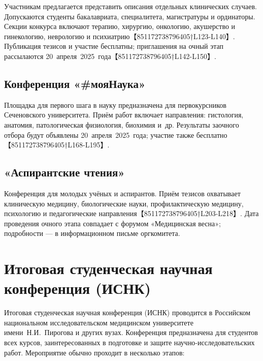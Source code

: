 \documentclass[
  russian,
  12pt,
  a4paper,
]{article}
\begin{document}
Участникам предлагается представить описания отдельных клинических
случаев. Допускаются студенты бакалавриата, специалитета, магистратуры и
ординаторы. Секции конкурса включают терапию, хирургию, онкологию,
акушерство и гинекологию, неврологию и
психиатрию【851172738796405†L123-L140】. Публикация тезисов и участие
бесплатны; приглашения на очный этап рассылаются
20~апреля~2025~года【851172738796405†L142-L150】.

\subsection{Конференция
«\#мояНаука»}\label{ux43aux43eux43dux444ux435ux440ux435ux43dux446ux438ux44f-ux43cux43eux44fux43dux430ux443ux43aux430}

Площадка для первого шага в науку предназначена для первокурсников
Сеченовского университета. Приём работ включает направления: гистология,
анатомия, патологическая физиология, биохимия и~др. Результаты заочного
отбора будут объявлены 20~апреля~2025~года; участие также
бесплатно【851172738796405†L168-L195】.

\subsection{«Аспирантские
чтения»}\label{ux430ux441ux43fux438ux440ux430ux43dux442ux441ux43aux438ux435-ux447ux442ux435ux43dux438ux44f}

Конференция для молодых учёных и аспирантов. Приём тезисов охватывает
клиническую медицину, биологические науки, профилактическую медицину,
психологию и педагогические направления【851172738796405†L203-L218】.
Дата проведения очного этапа совпадает с форумом «Медицинская весна»;
подробности --- в информационном письме оргкомитета.

\section{Итоговая студенческая научная конференция
(ИСНК)}\label{ux438ux442ux43eux433ux43eux432ux430ux44f-ux441ux442ux443ux434ux435ux43dux447ux435ux441ux43aux430ux44f-ux43dux430ux443ux447ux43dux430ux44f-ux43aux43eux43dux444ux435ux440ux435ux43dux446ux438ux44f-ux438ux441ux43dux43a}

Итоговая студенческая научная конференция (ИСНК) проводится в Российском
национальном исследовательском медицинском университете
имени~Н.И.~Пирогова и других вузах. Конференция предназначена для
студентов всех курсов, заинтересованных в подготовке и защите
научно‑исследовательских работ. Мероприятие обычно проходит в несколько
этапов:
\end{document}

